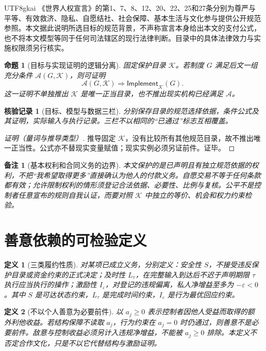 \documentclass[12pt,a4paper,openany]{report}
\newtheorem{definition}{定义}[chapter]
\newtheorem{proposition}{命题}[chapter]
\newtheorem{remark}{备注}[chapter]
\newtheorem{Certificate}{核验记录}[chapter]
\newcommand{\Charter}{\mathcal K}
\begin{document}
\begin{CJK*}{UTF8}{gkai}
《世界人权宣言》的第1、7、8、12、20、22、25和27条分别为尊严与平等、有效救济、隐私、自愿结社、社会保障、基本生活与文化参与提供公开规范参照\cite{UDHR}。本文据此说明所选目标的规范背景，不声称宣言本身给出本文的支付公式，也不将本文模型等同于任何司法辖区的现行法律判断。目录中的具体法律效力与实施权限须另行核实。

\begin{proposition}[目标与实现证明的逻辑分离]
\label{prop:normative}
固定保护目录 $\Charter$。若制度 $G$ 满足后文一组充分条件 $\mathcal A(G,\Charter)$，则可证明
\[
 \mathcal A(G,\Charter)\Longrightarrow\mathsf{Implement}_{\Charter}(G).
\]
这一证明不单独推出 $\Charter$ 是唯一正当目录，也不推出现实机构已经满足 $\mathcal A$。
\end{proposition}
\begin{Certificate}[目标、模型与数据三栏]
分别保存目录的规范选择依据，条件公式及其证明，实际输入与执行记录。三栏不以相同的“已通过”标志互相覆盖。
\end{Certificate}
\begin{proof}[证明（量词与推导类型）]
推导固定 $\Charter$，没有比较所有其他规范目录，故不推出唯一正当性。公式亦不替现实变量赋值；现实实例必须另证前件。证毕。
\end{proof}

\begin{remark}[基本权利和合同义务的边界]
本文保护的是已声明且有独立规范依据的权利，不把“我希望取得更多”直接确认为他人的付款义务。自愿交易不等于任何条款都有效；允许限制权利的情形须登记合法依据、必要性、比例与复核。公平不是控制者任意宣布的规则自我认证，而要对照 $\Charter$ 中独立的等价、机会和权力约束检验。
\end{remark}

\section{善意依赖的可检验定义}
\begin{definition}[三类履约性质]
\label{def:three-properties}
对某项已成立义务，分别定义：安全性 $S$，不接受违反保护目录或资金约束的正式决定；及时性 $L_\tau$，在完整输入到达后不迟于声明期限 $\tau$ 执行应当执行的操作；激励性 $I_\varepsilon$，对登记的违规偏离，私人净增益至多为 $-\varepsilon<0$。其中 $S$ 是可达状态约束，$L_\tau$ 是完成时间约束，$I_\varepsilon$ 是行为最优回应约束。
\end{definition}

\begin{definition}[不以个人善意为必要前件]
\label{def:goodwill}
以 $a_j\ge0$ 表示控制者因他人受益而取得的额外利他收益。若结构保障不读取 $a_j$，行为约束在 $a_j=0$ 时仍通过，则善意不是必要前件。敌意与控制收益必须另计入违规净增益，不能被 $a_j\ge0$ 排除。本定义不否定合作文化，只是不以它代替结构与激励证明。
\end{definition}


\end{CJK*}
\end{document}
